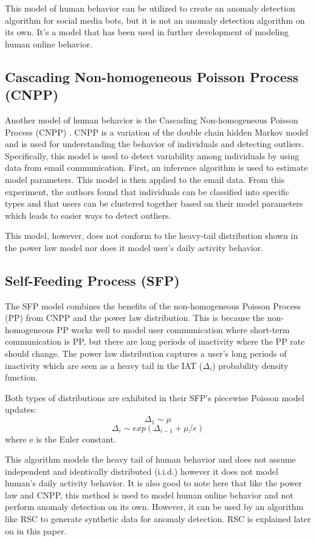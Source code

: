 \documentclass[11pt, oneside]{article}   	%
\begin{document}
\quad This model of human behavior can be utilized to create an anomaly detection algorithm for social media bots, but it is not an anomaly detection algorithm on its own. It's a model that has been used in further development of modeling human online behavior.

\subsection*{Cascading Non-homogeneous Poisson Process (CNPP) }

\quad Another model of human behavior is the Cascading Non-homogeneous Poisson Process (CNPP) \cite{cnpp}. CNPP is a variation of the double chain hidden Markov model and is used for understanding the behavior of individuals and detecting outliers.
Specifically, this model is used to detect variability among individuals by using data from email communication.
First, an inference algorithm is used to estimate model parameters. 
This model is then applied to the email data.
From this experiment, the authors found that individuals can be classified into specific types and that users can be clustered together based on their model parameters which leads to easier ways to detect outliers.

\quad This model, however, does not conform to the heavy-tail distribution shown in the power law model nor does it model user's daily activity behavior.

\subsection*{Self-Feeding Process (SFP) }

\quad The SFP model \cite{sfp} combines the benefits of the non-homogeneous Poisson Process (PP) from CNPP and the power law distribution.
This is because the non-homogeneous PP works well to model user communication where short-term communication is PP, but there are long periods of inactivity where the PP rate should change.
The power law distribution captures a user's long periods of inactivity which are seen as a heavy tail in the IAT ($\Delta_i$) probability density function.

\quad Both types of distributions are exhibited in their SFP's piecewise Poisson model updates:
$$ \Delta_1 \sim \mu $$
$$ \Delta_i \sim exp(\Delta_{i-1} + \mu / e) $$
where e is the Euler constant.

\quad This algorithm models the heavy tail of human behavior and does not assume independent and identically distributed (i.i.d.) however it does not model human's daily activity behavior. It is also good to note here that like the power law and CNPP, this method is used to model human online behavior and not perform anomaly detection on its own. However, it can be used by an algorithm like RSC \cite{rsc} to generate synthetic data for anomaly detection. RSC is explained later on in this paper.
\end{document}
